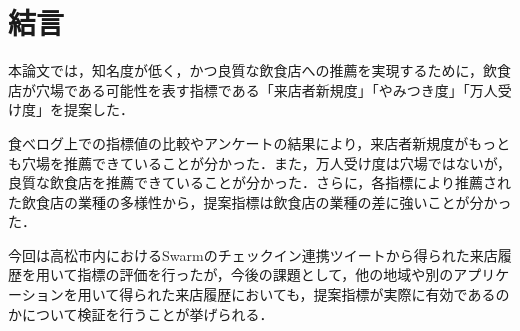 \chapter{結言}
\label{chap:conclusion}

 本論文では，知名度が低く，かつ良質な飲食店への推薦を実現するために，飲食店が穴場である可能性を表す指標である「来店者新規度」「やみつき度」「万人受け度」を提案した．\par
食べログ上での指標値の比較やアンケートの結果により，来店者新規度がもっとも穴場を推薦できていることが分かった．また，万人受け度は穴場ではないが，良質な飲食店を推薦できていることが分かった．さらに，各指標により推薦された飲食店の業種の多様性から，提案指標は飲食店の業種の差に強いことが分かった．\par
今回は高松市内におけるSwarmのチェックイン連携ツイートから得られた来店履歴を用いて指標の評価を行ったが，今後の課題として，他の地域や別のアプリケーションを用いて得られた来店履歴においても，提案指標が実際に有効であるのかについて検証を行うことが挙げられる．\par
